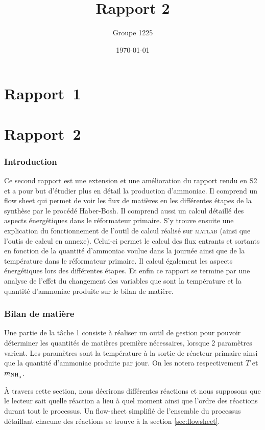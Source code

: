 \documentclass[a4paper, oneside, 12pt]{article}
\title{Rapport 2}
\author{Groupe 1225}
\date{\today}
\begin{document}
\maketitle

\part{Rapport~1}




\part{Rapport~2}

\section{Introduction}

Ce second rapport est une extension et une amélioration du rapport rendu 
en S2 et a pour but d'étudier plus en détail la production d'ammoniac. 
Il comprend un flow sheet qui permet de voir les flux de matières en 
les différentes étapes de la synthèse par le procédé Haber-Bosh. 
Il comprend aussi un calcul détaillé des aspects énergétiques dans le réformateur primaire.
S’y trouve ensuite une explication du fonctionnement de l’outil de calcul
réalisé sur \textsc{matlab} (ainsi que l'outis de calcul en annexe).
Celui-ci permet le calcul des flux entrants et sortants en fonction 
de la quantité d'ammoniac voulue dans la journée ainsi que de la 
température dans le réformateur primaire. Il calcul également les aspects énergétiques 
lors des différentes étapes. 
Et enfin ce rapport se termine par une analyse de l'effet du changement 
des variables que sont la température et la quantité d'ammoniac produite 
sur le bilan de matière.

\section{Bilan de matière}
\label{sec:bilan_matiere}

Une partie de la t\^ache 1 consiste à réaliser un outil de gestion
pour pouvoir déterminer les quantités de matières première nécessaires,
lorsque 2 paramètres varient. 
Les paramètres sont la température à la sortie de réacteur primaire ainsi
que la quantité d'ammoniac produite par jour. 
On les notera respectivement $T$ et $m_{\ce{NH3}}$.

À travers cette section, nous décrirons différentes réactions et nous 
supposons que le lecteur sait quelle réaction a lieu à quel moment ainsi 
que l'ordre des réactions durant tout le processus.
Un flow-sheet simplifié de l'ensemble du processus détaillant chacune
des réactions se trouve à la section \ref{sec:flowsheet}.
\end{document}
